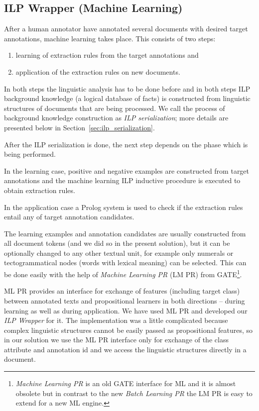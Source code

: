 \subsection{ILP Wrapper (Machine Learning)} \label{sec:impl_ilp_wrapper}
After a human annotator have annotated several documents with desired target annotations, machine learning takes place. 
This consists of two steps: 
\begin{enumerate}
	\item learning of extraction rules from the target annotations and
	\item application of the extraction rules on new documents.
\end{enumerate}
In both steps the linguistic analysis has to be done before and in both steps ILP background knowledge (a logical database of facts) is constructed from linguistic structures of documents that are being processed. We call the process of background knowledge construction as \emph{ILP serialization}; more details are presented below in Section~\ref{sec:ilp_serialization}.

After the ILP serialization is done, the next step depends on the phase which is being performed.

In the learning case, positive and negative examples are constructed from target annotations and the machine learning ILP inductive procedure is executed to obtain extraction rules.

In the application case a Prolog system is used to check if the extraction rules entail any of target annotation candidates.




The learning examples and annotation candidates are usually constructed from all document tokens (and we did so in the present solution), but it can be optionally changed to any other textual unit, for example only numerals or tectogrammatical nodes (words with lexical meaning) can be selected. This can be done easily with the help of \emph{Machine Learning PR} (LM PR) from GATE\footnote{\emph{Machine Learning PR} is an old GATE interface for ML and it is almost obsolete but in contrast to the new \emph{Batch Learning PR} the LM PR is easy to extend for a new ML engine.}.

ML PR provides an interface for exchange of features (including target class) between annotated texts and propositional learners in both directions -- during learning as well as during application. We have used ML PR and developed our \emph{ILP Wrapper} for it. The implementation was a little complicated because complex linguistic structures cannot be easily passed as propositional features, so in our solution we use the ML PR interface only for exchange of the class attribute and annotation id and we access the linguistic structures directly in a document.



